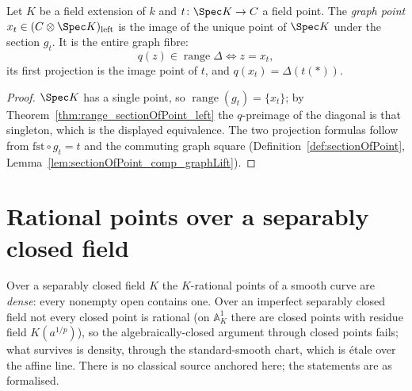 \begin{definition}
  \label{def:graphPoint}
  \leanok
  Let \(K\) be a field extension of \(k\) and \(t \colon \Spec K \to C\) a field point. The
  \emph{graph point} \(x_t \in (C \otimes \Spec K)_{\mathrm{left}}\) is the image of the
  unique point of \(\Spec K\) under the section \(g_t\). It is the entire graph fibre:
  \[
    q(z) \in \operatorname{range}\Delta \iff z = x_t ,
  \]
  its first projection is the image point of \(t\), and \(q(x_t) = \Delta(t(\ast))\).
\end{definition}
\begin{proof}
  \leanok
  \(\Spec K\) has a single point, so
  \(\operatorname{range}(g_t) = \{x_t\}\); by
  Theorem~\ref{thm:range_sectionOfPoint_left} the \(q\)-preimage of the diagonal is that
  singleton, which is the displayed equivalence. The two projection formulas follow from
  \(\mathrm{fst} \circ g_t = t\) and the commuting graph square
  (Definition~\ref{def:sectionOfPoint},
  Lemma~\ref{lem:sectionOfPoint_comp_graphLift}).
\end{proof}

\section{Rational points over a separably closed field}
\label{sec:separablyClosedPoints}

Over a separably closed field \(K\) the \(K\)-rational points of a smooth curve are
\emph{dense}: every nonempty open contains one. Over an imperfect separably closed field
not every closed point is rational (on \(\mathbb{A}^1_K\) there are closed points with residue
field \(K(a^{1/p})\)), so the algebraically-closed argument through closed points fails;
what survives is density, through the standard-smooth chart, which is \'etale over the
affine line. There is no classical source anchored here; the statements are as formalised.

